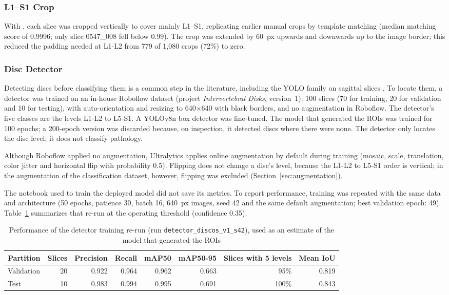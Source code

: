 \subsubsection{L1--S1 Crop}
With , each slice was cropped vertically to cover mainly L1--S1, replicating earlier manual crops by template matching (median matching score of 0.9996; only slice 0547\_008 fell below 0.99). The crop was extended by 60~px upwards and downwards up to the image border; this reduced the padding needed at L1-L2 from 779 of 1,080 crops (72\%) to zero.

\subsubsection{Disc Detector}
Detecting discs before classifying them is a common step in the literature, including the YOLO family on sagittal slices \cite{tan2024,sayed2025scirep}. To locate them, a detector was trained on an in-house Roboflow dataset (project \emph{Intervertebral Disks}, version~1): 100 slices (70 for training, 20 for validation and 10 for testing), with auto-orientation and resizing to 640$\times$640 with black borders, and no augmentation in Roboflow. The detector's five classes are the levels L1-L2 to L5-S1. A YOLOv8n box detector was fine-tuned. The model that generated the ROIs was trained for 100 epochs; a 200-epoch version was discarded because, on inspection, it detected discs where there were none. The detector only locates the disc level; it does not classify pathology.

Although Roboflow applied no augmentation, Ultralytics applies online augmentation by default during training (mosaic, scale, translation, color jitter and horizontal flip with probability 0.5). Flipping does not change a disc's level, because the L1-L2 to L5-S1 order is vertical; in the augmentation of the classification dataset, however, flipping was excluded (Section~\ref{sec:augmentation}).

The notebook used to train the deployed model did not save its metrics. To report performance, training was repeated with the same data and architecture (50 epochs, patience 30, batch 16, 640~px images, seed 42 and the same default augmentation; best validation epoch: 49). Table~\ref{tab:detector} summarizes that re-run at the operating threshold (confidence 0.35).

\begin{table}[t]
\centering\footnotesize
\caption{Performance of the detector training re-run (run \texttt{detector\_discos\_v1\_s42}), used as an estimate of the model that generated the ROIs}
\label{tab:detector}
\begin{tabular}{lrrrrrrr}
\toprule
Partition & Slices & Precision & Recall & mAP50 & mAP50-95 & Slices with 5 levels & Mean IoU \\
\midrule
Validation & 20 & 0.922 & 0.964 & 0.962 & 0.663 & 95\% & 0.819 \\
Test       & 10 & 0.983 & 0.994 & 0.995 & 0.691 & 100\% & 0.843 \\
\bottomrule
\end{tabular}
\end{table}

